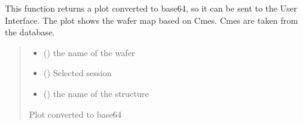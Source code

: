 \documentclass[letterpaper,10pt,english]{sphinxmanual}
\begin{document}

\begin{fulllineitems}
\label{\detokenize{WaferMaps:WaferMaps.Cmes_wafer_map}}
\pysigstartsignatures
{}
\pysigstopsignatures
\sphinxAtStartPar
This function returns a plot converted to base64, so it can be sent to the User Interface. The plot shows the wafer map based on Cmes.
Cmes are taken from the database.
\begin{quote}\begin{description}
\begin{itemize}
\item {} 
\sphinxAtStartPar
{} () \textendash{} the name of the wafer

\item {} 
\sphinxAtStartPar
{} () \textendash{} Selected session

\item {} 
\sphinxAtStartPar
{} () \textendash{} the name of the structure

\end{itemize}

\sphinxAtStartPar
Plot converted to base64

\end{description}\end{quote}

\end{fulllineitems}

\end{document}
